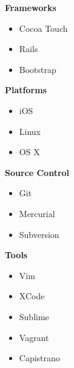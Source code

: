 \documentclass{res}
\begin{document}
\begin{resume}
   \vspace{-0.3in}	
    \textbf{Frameworks}
   \vspace{-0.1in}	
    \begin{multicols}{3}
        \begin{itemize}
            \item Cocoa Touch
            \item Rails
            \item Bootstrap
        \end{itemize}
    \end{multicols}

   \vspace{-0.3in}	
    \textbf{Platforms}
   \vspace{-0.1in}	
    \begin{multicols}{3}
        \begin{itemize}
            \item iOS
            \item Linux
            \item OS X
        \end{itemize}
    \end{multicols}

   \vspace{-0.3in}	
    \textbf{Source Control}
   \vspace{-0.1in}	
    \begin{multicols}{3}
        \begin{itemize}
            \item Git
            \item Mercurial
            \item Subversion
        \end{itemize}
    \end{multicols}

   \vspace{-0.3in}	
    \textbf{Tools}
   \vspace{-0.1in}	
    \begin{multicols}{3}
        \begin{itemize}
            \item Vim
            \item XCode
            \item Sublime
            \item Vagrant
            \item Capistrano
        \end{itemize}
    \end{multicols}



\end{resume}
\end{document}

